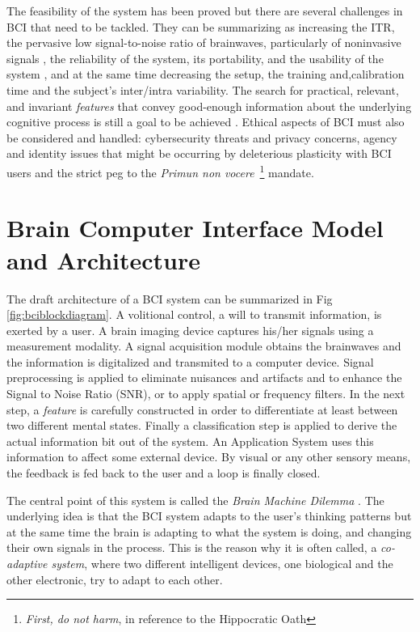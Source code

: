 \vspace{10px}

The feasibility of the system has been proved but there are several challenges in BCI that need to be tackled. They can be summarizing as 
increasing the ITR, the pervasive low signal-to-noise ratio of brainwaves, particularly of noninvasive signals \cite{Lotte2018}, the reliability of the system, its portability, and the usability of the system \cite{Wang2018}, and at the same time decreasing the setup, the training and,calibration time and the subject's inter/intra variability. The search for practical, relevant, and invariant \textit{features} that convey good-enough information about the underlying cognitive process is still a goal to be achieved \cite{Perdikis2014}.  Ethical aspects of BCI \cite{Yuste2017} must also be considered and handled: cybersecurity threats and privacy concerns,  agency and identity issues that might be occurring by deleterious plasticity with BCI users and the strict peg to the \textit{Primun non vocere}~\footnote{\textit{First, do not harm}, in reference to the Hippocratic Oath} mandate.


\section{Brain Computer Interface Model and Architecture}

The draft architecture of a BCI system can be summarized in Fig \ref{fig:bciblockdiagram}.  A volitional control, a will to transmit information, is exerted by a user. A brain imaging device captures his/her signals using a measurement modality.  A signal acquisition module obtains the brainwaves and the information is digitalized and transmited to a computer device.  Signal preprocessing is applied to eliminate nuisances and artifacts and to enhance the Signal to Noise Ratio (SNR), or to apply spatial or frequency filters.  In the next step, a \textit{feature} is carefully constructed in order to differentiate at least between two different mental states.  Finally a classification step is applied to derive the actual information bit out of the system.   An Application System uses this information to affect some external device.  By visual or any other sensory means, the feedback is fed back to the user and a loop is finally closed.

The central point of this system is called the \textit{Brain Machine Dilemma} \cite{WolpawJonathanR2012}.  The underlying idea is that the BCI system adapts to the user's thinking patterns but at the same time the brain is adapting to what the system is doing, and changing their own signals in the process.  This is the reason why it is often called, a \textit{co-adaptive system}, where two different intelligent devices, one biological and the other electronic, try to adapt to each other.

